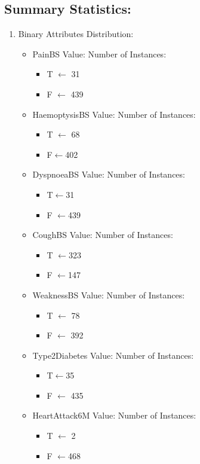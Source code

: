 \documentclass[a4paper, 11pt, oneside]{article} %
\begin{document}
\subsection {Summary Statistics:}
\begin{enumerate}
\item{Binary Attributes Distribution:}
\begin{itemize}
\item{PainBS Value: Number of Instances:}
\begin{itemize}
\item T $\leftarrow$ 31
\item F $\leftarrow$ 439
\end{itemize}
\item {HaemoptysisBS Value: Number of Instances:}
\begin{itemize}
\item T $\leftarrow$ 68
\item F$\leftarrow$402
\end{itemize}
\item{DyspnoeaBS Value: Number of Instances:}
\begin{itemize}
\item T$\leftarrow$31
\item F $\leftarrow$439
\end{itemize}
\item{CoughBS Value: Number of Instances:}
\begin{itemize}
\item T $\leftarrow$323
\item F $\leftarrow$147
\end{itemize}
\item{WeaknessBS Value: Number of Instances:}
\begin{itemize}
\item T $\leftarrow$ 78
\item F $\leftarrow$ 392
\end{itemize}
\item{Type2Diabetes Value: Number of Instances:}
\begin{itemize}
\item T$\leftarrow$35
\item F $\leftarrow$ 435
\end{itemize}
\item{HeartAttack6M Value: Number of Instances:}
\begin{itemize}
\item T $\leftarrow$ 2
\item F $\leftarrow$468

\end{itemize}
\end{itemize}
\end{enumerate}
\end{document}
